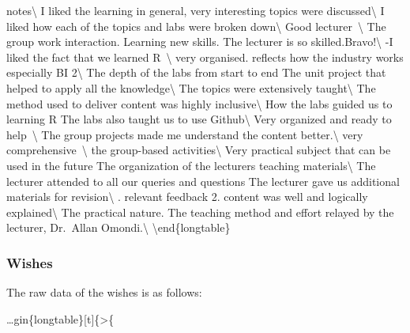 \documentclass[
]{article}
\begin{document}
notes\textbackslash{} \hline I liked the learning in general, very
interesting topics were discussed\textbackslash{} \hline I liked how
each of the topics and labs were broken down\textbackslash{} \hline Good
lecturer~\textbackslash{} \hline The group work interaction. Learning
new skills. The lecturer is so skilled.Bravo!\textbackslash{} \hline -I
liked the fact that we learned R~\textbackslash{} \hline very organised.
reflects how the industry works especially BI 2\textbackslash{} \hline
The depth of the labs from start to end The unit project that helped to
apply all the knowledge\textbackslash{} \hline The topics were
extensively taught\textbackslash{} \hline The method used to deliver
content was highly inclusive\textbackslash{} \hline How the labs guided
us to learning R The labs also taught us to use Github\textbackslash{}
\hline Very organized and ready to help~\textbackslash{} \hline The
group projects made me understand the content better.\textbackslash{}
\hline very comprehensive~\textbackslash{} \hline the group-based
activities\textbackslash{} \hline Very practical subject that can be
used in the future The organization of the lecturers teaching
materials\textbackslash{} \hline The lecturer attended to all our
queries and questions The lecturer gave us additional materials for
revision\textbackslash{} . relevant feedback 2. content was well and logically
explained\textbackslash{} \hline The practical nature. The teaching
method and effort relayed by the lecturer, Dr.~Allan
Omondi.\textbackslash{} \bottomrule \textbackslash end\{longtable\}

\newpage

\subsubsection{Wishes}\label{wishes}

The raw data of the wishes is as follows:

\ldots gin\{longtable\}{[}t{]}\{\textgreater\{

\raggedright
\end{document}
